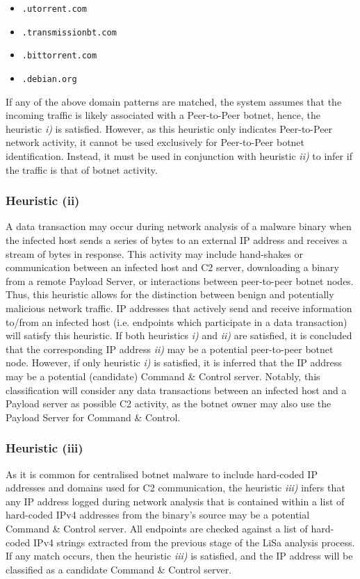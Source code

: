 \begin{itemize}
    \item \texttt{.utorrent.com}
    \item \texttt{.transmissionbt.com}
    \item \texttt{.bittorrent.com}
    \item \texttt{.debian.org}
\end{itemize}

If any of the above domain patterns are matched, the system assumes that the incoming traffic is likely associated with a Peer-to-Peer botnet, hence, the heuristic \textit{i)} is satisfied. However, as this heuristic only indicates Peer-to-Peer network activity, it cannot be used exclusively for Peer-to-Peer botnet identification. Instead, it must be used in conjunction with heuristic \textit{ii)} to infer if the traffic is that of botnet activity.

\subsubsection{Heuristic (ii)} A data transaction may occur during network analysis of a malware binary when the infected host sends a series of bytes to an external IP address and receives a stream of bytes in response. This activity may include hand-shakes or communication between an infected host and C2 server, downloading a binary from a remote Payload Server, or interactions between peer-to-peer botnet nodes. Thus, this heuristic allows for the distinction between benign and potentially malicious network traffic. IP addresses that actively send and receive information to/from an infected host (i.e. endpoints which participate in a data transaction) will satisfy this heuristic. If both heuristics \textit{i)} and \textit{ii)} are satisfied, it is concluded that the corresponding IP address \textit{ii)} may be a potential peer-to-peer botnet node. However, if only heuristic \textit{i)} is satisfied, it is inferred that the IP address may be a potential (candidate) Command \& Control server. Notably, this classification will consider any data transactions between an infected host and a Payload server as possible C2 activity, as the botnet owner may also use the Payload Server for Command \& Control.

\subsubsection{Heuristic (iii)} As it is common for centralised botnet malware to include hard-coded IP addresses and domains used for C2 communication, the heuristic \textit{iii)} infers that any IP address logged during network analysis that is contained within a list of hard-coded IPv4 addresses from the binary's source may be a potential Command \& Control server. All endpoints are checked against a list of hard-coded IPv4 strings extracted from the previous stage of the LiSa analysis process. If any match occurs, then the heuristic \textit{iii)} is satisfied, and the IP address will be classified as a candidate Command \& Control server.

